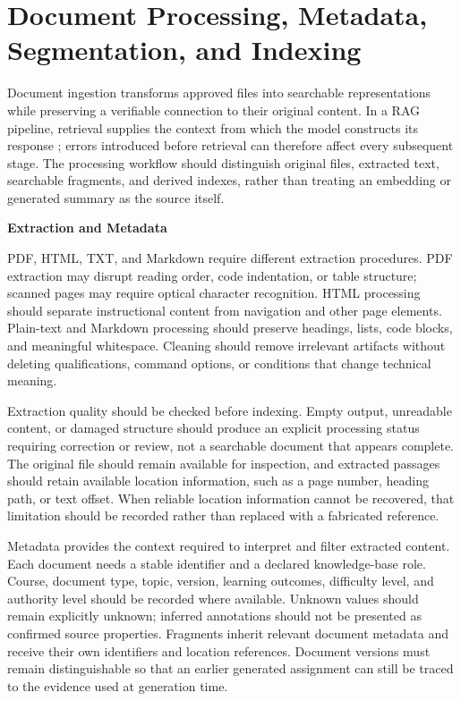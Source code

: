\documentclass[12pt,a4paper]{report}
\numberwithin{equation}{chapter}
\begin{document}
\section{Document Processing, Metadata, Segmentation, and Indexing}

Document ingestion transforms approved files into searchable representations while preserving a verifiable connection to their original content. In a RAG pipeline, retrieval supplies the context from which the model constructs its response \cite{Lewis2020}; errors introduced before retrieval can therefore affect every subsequent stage. The processing workflow should distinguish original files, extracted text, searchable fragments, and derived indexes, rather than treating an embedding or generated summary as the source itself.

\par\medskip
\textbf{Extraction and Metadata}

PDF, HTML, TXT, and Markdown require different extraction procedures. PDF extraction may disrupt reading order, code indentation, or table structure; scanned pages may require optical character recognition. HTML processing should separate instructional content from navigation and other page elements. Plain-text and Markdown processing should preserve headings, lists, code blocks, and meaningful whitespace. Cleaning should remove irrelevant artifacts without deleting qualifications, command options, or conditions that change technical meaning.

Extraction quality should be checked before indexing. Empty output, unreadable content, or damaged structure should produce an explicit processing status requiring correction or review, not a searchable document that appears complete. The original file should remain available for inspection, and extracted passages should retain available location information, such as a page number, heading path, or text offset. When reliable location information cannot be recovered, that limitation should be recorded rather than replaced with a fabricated reference.

Metadata provides the context required to interpret and filter extracted content. Each document needs a stable identifier and a declared knowledge-base role. Course, document type, topic, version, learning outcomes, difficulty level, and authority level should be recorded where available. Unknown values should remain explicitly unknown; inferred annotations should not be presented as confirmed source properties. Fragments inherit relevant document metadata and receive their own identifiers and location references. Document versions must remain distinguishable so that an earlier generated assignment can still be traced to the evidence used at generation time.
\end{document}
